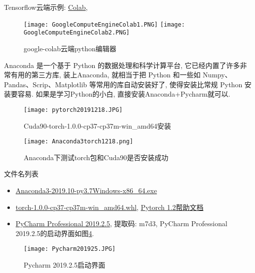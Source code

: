 Tensorflow云端示例: \href{https://colab.research.google.com/drive/1bHPCray2HwwuFwpiA_KH6Klkc3aB_6oh}{Colab},
\begin{figure}[htbp]
\centering
\texttt{[image: GoogleComputeEngineColab1.PNG]}
\texttt{[image: GoogleComputeEngineColab2.PNG]}
\caption{google-colab云端python编辑器}
\label{GoogleComputeEngineColab1}
\end{figure}

Anaconda 是一个基于 Python 的数据处理和科学计算平台, 它已经内置了许多非常有用的第三方库, 装上Anaconda, 就相当于把 Python 和一些如 Numpy、Pandas、Scrip、Matplotlib 等常用的库自动安装好了, 使得安装比常规 Python 安装要容易. 如果是学习Python的小白, 直接安装Anaconda+Pycharm就可以.
\begin{figure}[htbp]
\centering
\texttt{[image: pytorch20191218.JPG]}
\caption{Cuda90-torch-1.0.0-cp37-cp37m-win\_amd64安装}
\label{pytorch20191218}
\end{figure}
\begin{figure}[htbp]
\centering
\texttt{[image: Anaconda3torch1218.png]}
\caption{Anaconda下测试torch包和Cuda90是否安装成功}
\label{Anaconda20191218}
\end{figure}

文件名列表
\begin{itemize}
\item \href{https://repo.anaconda.com/archive/Anaconda2-2019.10-Windows-x86\_64.exe}{Anaconda3-2019.10-py3.7Windows-x86\_64.exe}

\item \href{https://download.pytorch.org/whl/cu90/torch-1.0.0-cp37-cp37m-win\_amd64.whl}{torch-1.0.0-cp37-cp37m-win\_amd64.whl}, \href{https://pytorch.apachecn.org/docs/1.2/}{Pytorch 1.2帮助文档}

\item \href{https://pan.baidu.com/s/1EGRWJeW522xzPjCkF_Fzlw}{PyCharm Professional 2019.2.5},  提取码: m7d3, PyCharm Professional 2019.2.5的启动界面如图\ref{Pycharm20191218001}.
\end{itemize}
\begin{figure}[htbp]
\centering
\texttt{[image: Pycharm201925.JPG]}
\caption{Pycharm 2019.2.5启动界面}
\label{Pycharm20191218001}
\end{figure}

